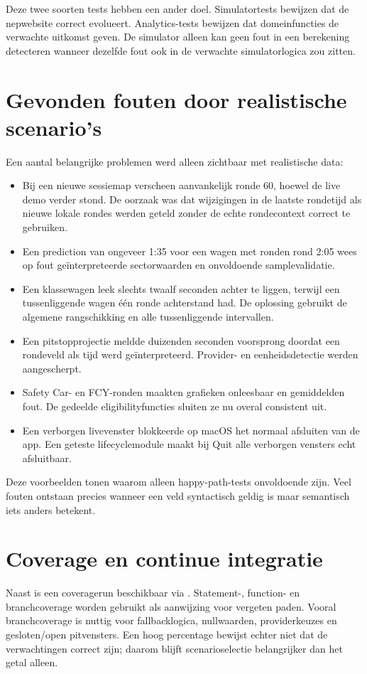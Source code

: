 Deze twee soorten tests hebben een ander doel. Simulatortests bewijzen dat de nepwebsite correct evolueert. Analytics-tests bewijzen dat domeinfuncties de verwachte uitkomst geven. De simulator alleen kan geen fout in een berekening detecteren wanneer dezelfde fout ook in de verwachte simulatorlogica zou zitten.

\section{Gevonden fouten door realistische scenario's}
Een aantal belangrijke problemen werd alleen zichtbaar met realistische data:

\begin{itemize}
  \item Bij een nieuwe sessiemap verscheen aanvankelijk ronde 60, hoewel de live demo verder stond. De oorzaak was dat wijzigingen in de laatste rondetijd als nieuwe lokale rondes werden geteld zonder de echte rondecontext correct te gebruiken.
  \item Een prediction van ongeveer 1:35 voor een wagen met ronden rond 2:05 wees op fout geïnterpreteerde sectorwaarden en onvoldoende samplevalidatie.
  \item Een klassewagen leek slechts twaalf seconden achter te liggen, terwijl een tussenliggende wagen één ronde achterstand had. De oplossing gebruikt de algemene rangschikking en alle tussenliggende intervallen.
  \item Een pitstopprojectie meldde duizenden seconden voorsprong doordat een rondeveld als tijd werd geïnterpreteerd. Provider- en eenheidsdetectie werden aangescherpt.
  \item Safety Car- en FCY-ronden maakten grafieken onleesbaar en gemiddelden fout. De gedeelde eligibilityfuncties sluiten ze nu overal consistent uit.
  \item Een verborgen livevenster blokkeerde op macOS het normaal afsluiten van de app. Een geteste lifecyclemodule maakt bij Quit alle verborgen vensters echt afsluitbaar.
\end{itemize}

Deze voorbeelden tonen waarom alleen happy-path-tests onvoldoende zijn. Veel fouten ontstaan precies wanneer een veld syntactisch geldig is maar semantisch iets anders betekent.

\section{Coverage en continue integratie}
Naast  is een coveragerun beschikbaar via . Statement-, function- en branchcoverage worden gebruikt als aanwijzing voor vergeten paden. Vooral branchcoverage is nuttig voor fallbacklogica, nullwaarden, providerkeuzes en gesloten/open pitvensters. Een hoog percentage bewijst echter niet dat de verwachtingen correct zijn; daarom blijft scenarioselectie belangrijker dan het getal alleen.

